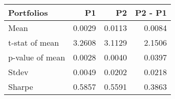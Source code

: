 \begin{tabular}{lrrr}
\toprule
Portfolios & P1 & P2 & P2 - P1 \\
\midrule
Mean & 0.0029 & 0.0113 & 0.0084 \\
t-stat of mean & 3.2608 & 3.1129 & 2.1506 \\
p-value of mean & 0.0028 & 0.0040 & 0.0397 \\
Stdev & 0.0049 & 0.0202 & 0.0218 \\
Sharpe & 0.5857 & 0.5591 & 0.3863 \\
\bottomrule
\end{tabular}
